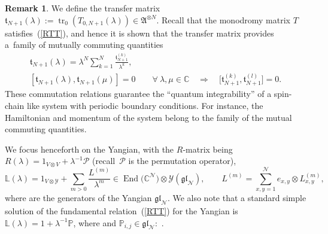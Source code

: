 \documentclass[pdftex]{sigma}
\numberwithin{equation}{section}
\theoremstyle{definition}
\newtheorem{rem}[thm]{Remark}
\DeclareMathOperator{\EEnd}{End}%
\begin{document}
\begin{rem}{\label{tt}} We define the transfer matrix ${\mathfrak t}_{N+1}(\lambda) := \operatorname{tr}_0 (T_{0,N+1}(\lambda)) \in
{\mathfrak A}^{\otimes N}$.
Recall that the monodromy matrix $T$ satisfies~(\ref{RTT}), and hence it is shown that the transfer matrix provides a~family of mutually
commuting quantities~\cite{FadTakRes}
\begin{gather*}
{\mathfrak t}_{N+1}(\lambda) =\lambda^N \sum_{k=1}^N \frac{{\mathfrak t}_{N+1}^{(k)}}{\lambda^k},\\
[ {\mathfrak t}_{N+1}(\lambda), {\mathfrak t}_{N+1}(\mu)] =0\qquad \forall\ \lambda, \mu \in {\mathbb C}\quad \Rightarrow\quad \bigl[ {\mathfrak t}_{N+1}^{(k)}, {\mathfrak t}_{N+1}^{(l)}\bigr] =0.
\end{gather*}
These commutation relations guarantee the ``quantum integrability'' of a spin-chain like system with periodic boundary conditions. For instance, the Hamiltonian and momentum of the system belong to the family of the mutual commuting quantities.
\end{rem}

We focus henceforth on the Yangian, with the $R$-matrix being $R(\lambda) = 1_{V \otimes V} + \lambda^{-1}{\mathcal P}$ (recall~${\mathcal P}$ is the permutation operator),
\[
{\mathbb L}(\lambda) =1_{V \otimes {\mathcal Y}} + \sum_{m>0}\frac{L^{(m)}}{\lambda^m} \in \EEnd\bigl({\mathbb C}^{\mathcal N}\bigr) \otimes
{\mathcal Y}(\mathfrak{gl}_{\mathcal N}), \qquad L^{(m)} = \sum_{x, y=1}^{{\mathcal N}} e_{x, y} \otimes L^{(m)}_{x,y},\]
where
 are the generators of the Yangian $\mathfrak{gl}_{\mathcal N}$. We also note that a standard simple solution of the fundamental relation~(\ref{RTT}) for the Yangian is ${\mathbb L}(\lambda) = 1 +\lambda^{-1} {\mathbb P}$, where  and ${\mathbb P}_{i,j} \in \mathfrak{gl}_{\mathcal N}:$ .
\end{document}
